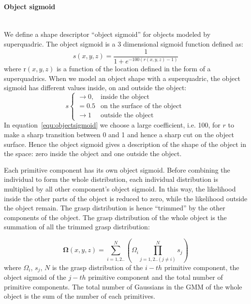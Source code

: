 \paragraph{Object sigmoid} ~\\
\label{cha3:sec4:combine:sigmoid}
We define a shape descriptor ``object sigmoid'' for objects modeled by superquadric. The object sigmoid is a 3 dimensional sigmoid function defined as:
\begin{equation}
s\left(x, y ,z\right) = \frac{1}{1+e^{-100\left(r\left(x, y ,z\right)-1\right)}}
\label{equ:objectsigmoid}
\end{equation}
where r$\left(x, y ,z\right)$ is a function of the location defined in the form of a superquadrics. When we model an object shape with a superquadric, the object sigmoid has different values inside, on and outside the object:
\begin{equation}
    s
    \begin{cases}
        \rightarrow0, & \text{inside the object}\  \\
        =0.5 & \text{on the surface of the object}\ \\
        \rightarrow1 & \text{outside the object}
    \end{cases}
\end{equation}
In equation~\ref{equ:objectsigmoid} we choose a large coefficient, i.e. 100, for $r$ to make a sharp transition between 0 and 1 and hence a sharp cut on the object surface. Hence the object sigmoid gives a description of the shape of the object in the space: zero inside the object and one outside the object.

Each primitive component has its own object sigmoid. Before combining the individual to form the whole distribution, each individual distribution is multiplied by all other component's object sigmoid. In this way, the likelihood inside the other parts of the object is reduced to zero, while the likelihood outside the object remain. The grasp distribution is hence ``trimmed'' by the other components of the object. The grasp distribution of the whole object is the summation of all the trimmed grasp distribution:

\begin{equation}
\boldsymbol{\Omega}\left(x,y,z\right) = \sum_{i=1,2..}^{N}\left(\Omega_i\prod_{j=1,2..\left(j\neq{i}\right)}^{N}s_j\right)
\end{equation}
where $\Omega_i$, $s_j$, $N$ is the grasp distribution of the $i-th$ primitive component, the object sigmoid of the $j-th$ primitive component and the total number of primitive components. The total number of Gaussians in the GMM of the whole object is the sum of the number of each primitives.

